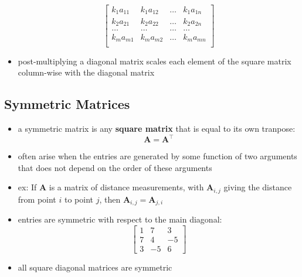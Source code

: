 \documentclass[11pt,twocolumn]{report}
\begin{document}
\begin{itemize}
\begin{scriptsize}
\begin{equation*}
        \begin{bmatrix}
          k_1a_{11} & k_1a_{12} & \hdots & k_1a_{1n}\\
          k_2a_{21} & k_2a_{22} & \hdots & k_2a_{2n}\\
          \hdots & \hdots & \hdots & \hdots\\
          k_ma_{m1} & k_ma_{m2} & \hdots & k_ma_{mn}\\
        \end{bmatrix}
      \end{equation*}
    \end{scriptsize}
  \item post-multiplying a diagonal matrix scales each element of the square
    matrix column-wise with the diagonal matrix
\end{itemize}

\subsection{Symmetric Matrices}
\begin{itemize}
  \item a symmetric matrix is any \textbf{square matrix} that is equal to its
    own tranpose:
    \begin{equation}
      \bm{A} = \bm{A}^\intercal
    \end{equation}
  \item often arise when the entries are generated by some function of two
    arguments that does not depend on the order of these arguments
  \item ex: If $\bm{A}$ is a matrix of distance measurements, with $\bm{A}_{i,
      j}$ giving the distance from point $i$ to point $j$, then $\bm{A}_{i,j} =
    \bm{A}_{j, i}$
  \item entries are symmetric with respect to the main diagonal:
    \begin{equation*}
      \begin{bmatrix}
        1 & 7 & 3 \\
        7 & 4 & -5 \\
        3 & -5 & 6
      \end{bmatrix}
    \end{equation*}
  \item all square diagonal matrices are symmetric
\end{itemize}
\end{document}
